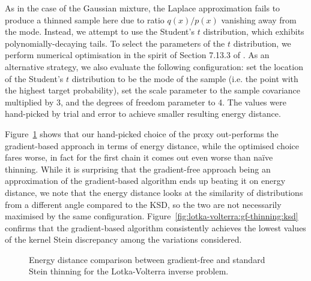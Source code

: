 \documentclass[11pt,a4paper]{report}
\begin{document}
As in the case of the Gaussian mixture, the Laplace approximation fails to produce a thinned sample here due to ratio $q(x) / p(x)$ vanishing away from the mode. Instead, we attempt to use the Student's $t$ distribution, which exhibits polynomially-decaying tails. To select the parameters of the $t$ distribution, we perform numerical optimisation in the spirit of Section 7.13.3 of \cite{ruppertStatisticsDataAnalysis2015}. As an alternative strategy, we also evaluate the following configuration: set the location of the Student's $t$ distribution to be the mode of the sample (i.e. the point with the highest target probability), set the scale parameter to the sample covariance multiplied by 3, and the degrees of freedom parameter to 4. The values were hand-picked by trial and error to achieve smaller resulting energy distance.

Figure~\ref{fig:lotka-volterra:gf-thinning:energy-distance} shows that our hand-picked choice of the proxy out-performs the gradient-based approach in terms of energy distance, while the optimised choice fares worse, in fact for the first chain it comes out even worse than na\"ive thinning. While it is surprising that the gradient-free approach being an approximation of the gradient-based algorithm ends up beating it on energy distance, we note that the energy distance looks at the similarity of distributions from a different angle compared to the KSD, so the two are not necessarily maximised by the same configuration. Figure~\ref{fig:lotka-volterra:gf-thinning:ksd} confirms that the gradient-based algorithm consistently achieves the lowest values of the kernel Stein discrepancy among the variations considered.

\begin{figure}[h]
\centering
{}
\caption{Energy distance comparison between gradient-free and standard Stein thinning for the Lotka-Volterra inverse problem.
\label{fig:lotka-volterra:gf-thinning:energy-distance}}
\end{figure}
\end{document}
